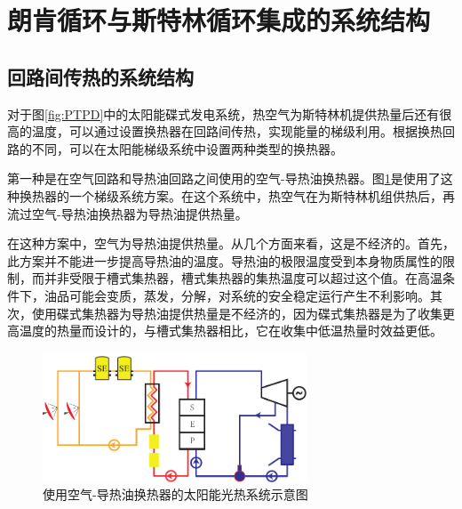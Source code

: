 \section{朗肯循环与斯特林循环集成的系统结构}

\subsection{回路间传热的系统结构}
\label{sec:hebc}

对于图\ref{fig:PTPD}中的太阳能碟式发电系统，热空气为斯特林机提供热量后还有很高的温度，可以通过设置换热器在回路间传热，实现能量的梯级利用。根据换热回路的不同，可以在太阳能梯级系统中设置两种类型的换热器。

第一种是在空气回路和导热油回路之间使用的空气-导热油换热器。图\ref{fig:air-oil}是使用了这种换热器的一个梯级系统方案。在这个系统中，热空气在为斯特林机组供热后，再流过空气-导热油换热器为导热油提供热量。

在这种方案中，空气为导热油提供热量。从几个方面来看，这是不经济的。首先，此方案并不能进一步提高导热油的温度。导热油的极限温度受到本身物质属性的限制，而并非受限于槽式集热器，槽式集热器的集热温度可以超过这个值。在高温条件下，油品可能会变质，蒸发，分解，对系统的安全稳定运行产生不利影响。其次，使用碟式集热器为导热油提供热量是不经济的，因为碟式集热器是为了收集更高温度的热量而设计的，与槽式集热器相比，它在收集中低温热量时效益更低。

\begin{figure}[ht]
\centering 
\includegraphics[width=0.7\textwidth]{fig/air-oil}
\caption{使用空气-导热油换热器的太阳能光热系统示意图}\label{fig:air-oil}
\end{figure}

